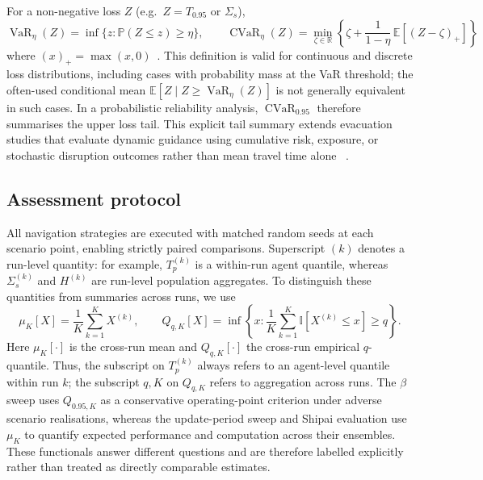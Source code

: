 \documentclass[preprint,12pt]{elsarticle}
\providecommand{\FloatBarrier}{}
\let\origsubsection\subsection
\renewcommand{\subsection}{\FloatBarrier\origsubsection}
\begin{document}
For a non-negative loss $Z$ (e.g.\ $Z = T_{0.95}$ or $\Sigma_s$),
\begin{equation}
\operatorname{VaR}_\eta(Z) = \inf\{z : \mathbb{P}(Z \le z) \ge \eta\},
\qquad
\operatorname{CVaR}_\eta(Z)
= \min_{\zeta \in \mathbb{R}}
\left\{
\zeta + \frac{1}{1-\eta}\,
\mathbb{E}\!\left[(Z-\zeta)_+\right]
\right\}
\label{eq:cvar}
\end{equation}
where $(x)_+=\max(x,0)$~\citep{Rockafellar2002CVaR}. This definition is
valid for continuous and discrete loss distributions, including cases
with probability mass at the VaR threshold; the often-used conditional
mean $\mathbb{E}[Z\mid Z\geq\operatorname{VaR}_\eta(Z)]$ is not generally
equivalent in such cases. In a probabilistic reliability analysis,
$\operatorname{CVaR}_{0.95}$ therefore summarises the upper loss tail.
This explicit tail summary extends evacuation studies that evaluate
dynamic guidance using cumulative risk, exposure, or stochastic
disruption outcomes rather than mean travel time alone
~\citep{He2024DynamicMultiHazardEvac,Luan2025ToxicGasAirport,Yang2025MetroStampede}.


\subsection{Assessment protocol}
\label{sec:assessment_protocol}

All navigation strategies are executed with matched random seeds at
each scenario point, enabling strictly paired comparisons. Superscript
$(k)$ denotes a run-level quantity: for example,
$T_p^{(k)}$ is a within-run agent quantile, whereas
$\Sigma_s^{(k)}$ and $H^{(k)}$ are run-level population aggregates. To
distinguish these quantities from summaries across runs, we use
\begin{equation}
\mu_K[X] = \frac{1}{K}\sum_{k=1}^{K}X^{(k)},
\qquad
Q_{q,K}[X] = \inf\!\left\{x:
\frac{1}{K}\sum_{k=1}^{K}\mathbb{I}\!\left[X^{(k)}\le x\right]\ge q
\right\}.
\label{eq:ensemble_summaries}
\end{equation}
Here $\mu_K[\cdot]$ is the cross-run mean and $Q_{q,K}[\cdot]$ the
cross-run empirical $q$-quantile. Thus, the subscript on $T_p^{(k)}$
always refers to an agent-level quantile within run $k$;
the subscript $q,K$ on $Q_{q,K}$ refers to aggregation across runs.
The $\beta$ sweep uses $Q_{0.95,K}$ as a conservative operating-point
criterion under adverse scenario realisations, whereas the update-period
sweep and Shipai evaluation use $\mu_K$ to quantify expected performance
and computation across their ensembles. These functionals answer
different questions and are therefore labelled explicitly rather than
treated as directly comparable estimates.
\end{document}
